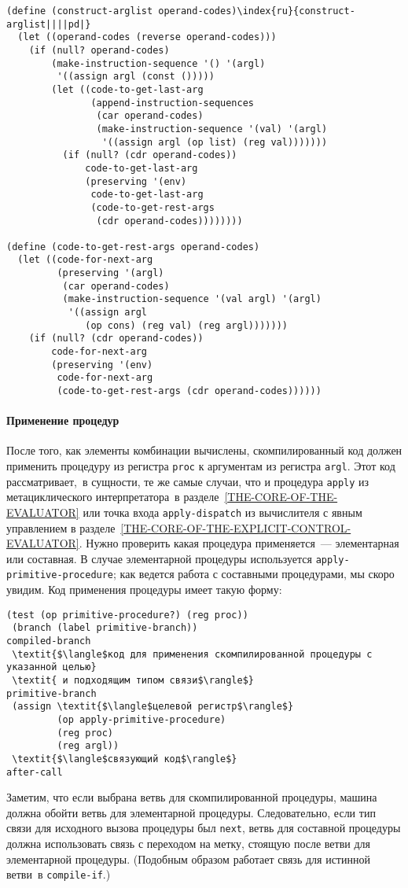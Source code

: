 \begin{Verbatim}[fontsize=\small]
(define (construct-arglist operand-codes)\index{ru}{construct-arglist||||pd|}
  (let ((operand-codes (reverse operand-codes)))
    (if (null? operand-codes)
        (make-instruction-sequence '() '(argl)
         '((assign argl (const ()))))
        (let ((code-to-get-last-arg
               (append-instruction-sequences
                (car operand-codes)
                (make-instruction-sequence '(val) '(argl)
                 '((assign argl (op list) (reg val)))))))
          (if (null? (cdr operand-codes))
              code-to-get-last-arg
              (preserving '(env)
               code-to-get-last-arg
               (code-to-get-rest-args
                (cdr operand-codes))))))))

(define (code-to-get-rest-args operand-codes)
  (let ((code-for-next-arg
         (preserving '(argl)
          (car operand-codes)
          (make-instruction-sequence '(val argl) '(argl)
           '((assign argl
              (op cons) (reg val) (reg argl)))))))
    (if (null? (cdr operand-codes))
        code-for-next-arg
        (preserving '(env)
         code-for-next-arg
         (code-to-get-rest-args (cdr operand-codes))))))
\end{Verbatim}

\paragraph{Применение процедур}


После того, как элементы комбинации вычислены,
скомпилированный код должен применить процедуру из регистра
{\tt proc} к аргументам из регистра {\tt argl}.  Этот
код рассматривает,~в сущности, те же самые случаи, что и процедура
{\tt apply} из метациклического интерпретатора~в 
разделе~\ref{THE-CORE-OF-THE-EVALUATOR} или точка
входа {\tt apply-dispatch} из вычислителя с явным управлением в
разделе~\ref{THE-CORE-OF-THE-EXPLICIT-CONTROL-EVALUATOR}.
Нужно проверить какая процедура применяется~--- элементарная или составная.  В
случае элементарной процедуры используется
{\tt apply-primitive-procedure}; как ведется работа с
составными процедурами, мы скоро увидим.  Код применения процедуры
имеет такую форму:

\begin{Verbatim}[fontsize=\small]
 (test (op primitive-procedure?) (reg proc))
 (branch (label primitive-branch))
compiled-branch
 \textit{$\langle$код для применения скомпилированной процедуры с указанной целью}
 \textit{ и подходящим типом связи$\rangle$}
primitive-branch
 (assign \textit{$\langle$целевой регистр$\rangle$}
         (op apply-primitive-procedure)
         (reg proc)
         (reg argl))
 \textit{$\langle$связующий код$\rangle$}
after-call
\end{Verbatim}
Заметим, что если выбрана ветвь для скомпилированной процедуры, машина
должна обойти ветвь для элементарной процедуры.  Следовательно, если
тип связи для исходного вызова процедуры был {\tt next},
ветвь для составной процедуры должна использовать связь с переходом на
метку, стоящую после ветви для элементарной процедуры.  (Подобным
образом работает связь для истинной ветви~в {\tt compile-if}.)

